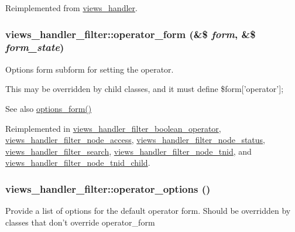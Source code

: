 Reimplemented from \hyperlink{classviews__handler_a31b0961d9c04ea88289b1a0b34d08ab1}{views\_\-handler}.\hypertarget{classviews__handler__filter_a8c77c0a8bba8c3ceceae8950fc7b1121}{
\subsubsection[{operator\_\-form}]{\setlength{\rightskip}{0pt plus 5cm}views\_\-handler\_\-filter::operator\_\-form (\&\$ {\em form}, \/  \&\$ {\em form\_\-state})}}
\label{classviews__handler__filter_a8c77c0a8bba8c3ceceae8950fc7b1121}
Options form subform for setting the operator.

This may be overridden by child classes, and it must define \$form\mbox{[}'operator'\mbox{]};

\begin{DoxySeeAlso}{See also}
\hyperlink{classviews__handler__filter_af14c69367162057a32709a6340de0988}{options\_\-form()} 
\end{DoxySeeAlso}


Reimplemented in \hyperlink{classviews__handler__filter__boolean__operator_a2b8c0523843b8f24144bf5a59254cdd9}{views\_\-handler\_\-filter\_\-boolean\_\-operator}, \hyperlink{classviews__handler__filter__node__access_af1cb315c0afc295fa7ded78ee47401c8}{views\_\-handler\_\-filter\_\-node\_\-access}, \hyperlink{classviews__handler__filter__node__status_a667b6e76f34a6665898585ae13cb2842}{views\_\-handler\_\-filter\_\-node\_\-status}, \hyperlink{classviews__handler__filter__search_a126abdcf04c59fd3e4be404ffd9969cf}{views\_\-handler\_\-filter\_\-search}, \hyperlink{classviews__handler__filter__node__tnid_a92d26c1ecccc0a2985d4195a46c7e87b}{views\_\-handler\_\-filter\_\-node\_\-tnid}, and \hyperlink{classviews__handler__filter__node__tnid__child_ae0cfa82e361de74d4f24f820f5106117}{views\_\-handler\_\-filter\_\-node\_\-tnid\_\-child}.\hypertarget{classviews__handler__filter_acbd69b92e9199530a54069c79368db7f}{
\subsubsection[{operator\_\-options}]{\setlength{\rightskip}{0pt plus 5cm}views\_\-handler\_\-filter::operator\_\-options ()}}
\label{classviews__handler__filter_acbd69b92e9199530a54069c79368db7f}
Provide a list of options for the default operator form. Should be overridden by classes that don't override operator\_\-form 

